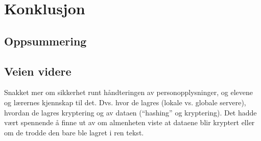 \section{Konklusjon}

\subsection{Oppsummering}

\subsection{Veien videre}

Snakket mer om sikkerhet runt håndteringen av personopplysninger, og elevene og lærernes kjennskap til det. Dvs. hvor de lagres (lokale vs. globale servere), hvordan de lagres kryptering og av dataen (``hashing'' og kryptering). Det hadde vært spennende å finne ut av om almenheten viste at dataene blir kryptert eller om de trodde den bare ble lagret i ren tekst.

\newpage
